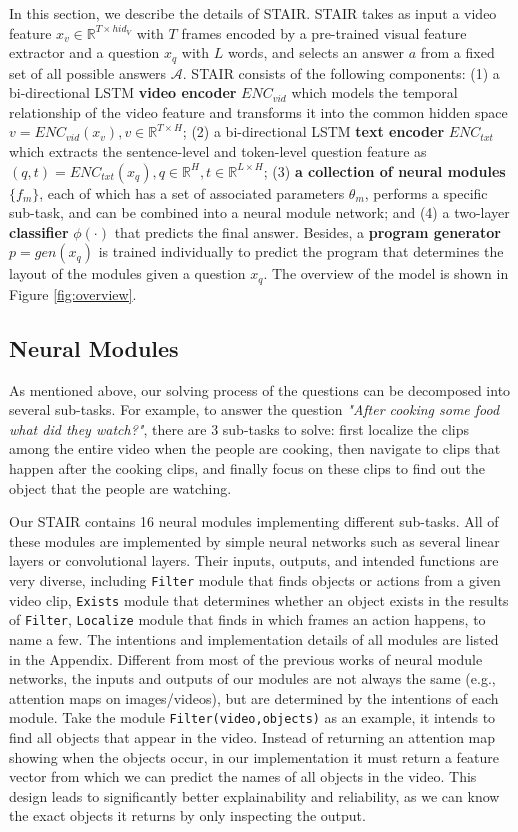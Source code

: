 \documentclass[letterpaper]{article} %
\begin{document}
In this section, we describe the details of STAIR. STAIR takes as input a video feature $x_v \in \mathbb{R}^{T \times hid_V}$ with $T$ frames encoded by a pre-trained visual feature extractor and a question $x_q$ with $L$ words, and selects an answer $a$ from a fixed set of all possible answers $\mathcal{A}$. STAIR consists of the following components:
(1) a bi-directional LSTM \textbf{video encoder} ${ENC}_{vid}$ which models the temporal relationship of the video feature and transforms it into the common hidden space $v = {ENC}_{vid}(x_v), v \in \mathbb{R}^{T \times H}$; (2) a bi-directional LSTM \textbf{text encoder} ${ENC}_{txt}$ which extracts the sentence-level and token-level question feature as $(q, t)={ENC}_{txt}(x_q), q \in \mathbb{R}^H, t \in \mathbb{R}^{L \times H}$; (3) \textbf{a collection of neural modules} $\{f_m\}$, each of which has a set of associated parameters $\theta_m$, performs a specific sub-task, and can be combined into a neural module network; and (4) a two-layer \textbf{classifier} $\phi(\cdot)$ that predicts the final answer. Besides, a \textbf{program generator} $p = gen(x_q)$ is trained individually to predict the program that determines the layout of the modules given a question $x_q$. The overview of the model is shown in Figure \ref{fig:overview}.

\subsection{Neural Modules}
As mentioned above, our solving process of the questions can be decomposed into several sub-tasks. For example, to answer the question \textit{"After cooking some food what did they watch?"}, there are 3 sub-tasks to solve: first localize the clips among the entire video when the people are cooking, then navigate to clips that happen after the cooking clips, and finally focus on these clips to find out the object that the people are watching.

Our STAIR contains 16 neural modules implementing different sub-tasks. All of these modules are implemented by simple neural networks such as several linear layers or convolutional layers. Their inputs, outputs, and intended functions are very diverse, including \texttt{Filter} module that finds objects or actions from a given video clip, \texttt{Exists} module that determines whether an object exists in the results of \texttt{Filter}, \texttt{Localize} module that finds in which frames an action happens, to name a few. The intentions and implementation details of all modules are listed in the Appendix. Different from most of the previous works of neural module networks, the inputs and outputs of our modules are not always the same (e.g., attention maps on images/videos), but are determined by the intentions of each module. Take the module \texttt{Filter(video,objects)} as an example, it intends to find all objects that appear in the video. Instead of returning an attention map showing when the objects occur, in our implementation it must return a feature vector from which we can predict the names of all objects in the video. This design leads to significantly better explainability and reliability, as we can know the exact objects it returns by only inspecting the output.
\end{document}
